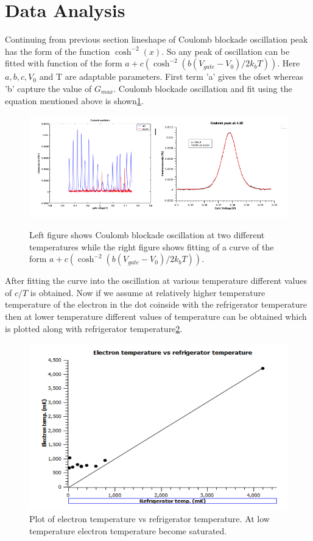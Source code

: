 \documentclass[a4paper]{report}
\begin{document}
  \section*{Data Analysis}
    \hspace{10pt} Continuing from previous section lineshape of Coulomb blockade oscillation peak has the form of the function $\cosh^{-2} (x)$. So any peak of oscillation can be fitted with function of the form $a+c\left(\cosh^{-2}(b(V_{gate}-V_{0})/2k_{b}T)\right)$. Here $a,b,c,V_{0}$ and T are adaptable parameters. First term  'a' gives the ofset whereas 'b' capture the value of $G_{max}$. Coulomb blockade oscillation and fit using the equation mentioned above is shown\ref{fig2}.
    \begin{figure}[h]
      \centering
      \includegraphics[scale=0.5]{image/cbo1}\label{fig2}
      \caption{Left figure shows Coulomb blockade oscillation at two different temperatures while the right figure shows fitting of a curve of the form $a+c\left(\cosh^{-2}(b(V_{gate}-V_{0})/2k_{b}T)\right)$.}
    \end{figure}
  
    After fitting the curve into the oscillation at various temperature different values of $c/T$ is obtained. Now if we assume at relatively higher temperature temperature of the electron in the dot coinside with the refrigerator temperature then at lower temperature different values of temperature can be obtained which is plotted along with refrigerator temperature\ref{fig3}.
    \begin{figure}[h] \label{fig3}
      \centering
      \includegraphics[scale=0.27]{image/rft}
      \caption{Plot of electron temperature vs refrigerator temperature. At low temperature electron temperature become saturated.}
    \end{figure}
\end{document}
